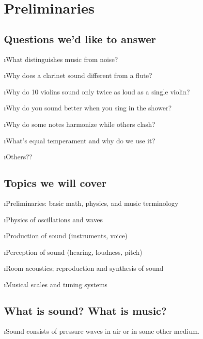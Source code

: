 \section{Preliminaries}

\subsection{Questions we'd like to answer}

\bi

\i What distinguishes music from noise?

\i Why does a clarinet sound different from a flute?


\i Why do 10 violins sound only twice as loud as a single violin?

\i Why do you sound better when you sing in the shower?

\i Why do some notes harmonize while others clash?

\i What's equal temperament and why do we use it?

\i Others??

\ei

\subsection{Topics we will cover}

\bi

\i Preliminaries: basic math, physics, and music terminology

\i Physics of oscillations and waves

\i Production of sound (instruments, voice)

\i Perception of sound (hearing, loudness, pitch)

\i Room acoustics; reproduction and synthesis of 
sound

\i Musical scales and tuning systems

\ei
\subsection{What is sound? What is music?}
\bi

\i Sound consists of pressure waves in air or 
in some other medium.

